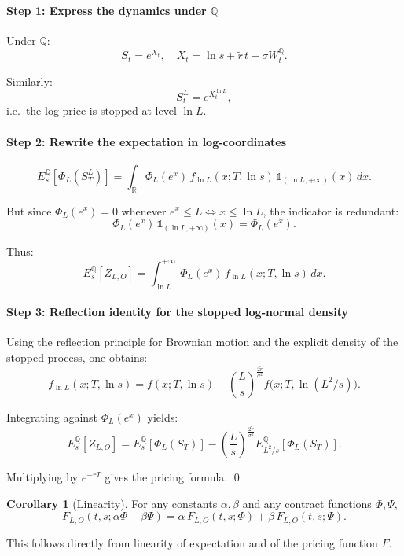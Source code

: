 \documentclass[12pt,a4paper]{article}
\theoremstyle{definition}
\newtheorem{corollary}{Corollary}[section]
\begin{document}
\paragraph{Step 1: Express the dynamics under $\mathbb{Q}$}

Under $\mathbb{Q}$:
\[
S_t = e^{X_t}, \quad X_t = \ln s + \widetilde{r}\, t + \sigma W_t^\mathbb{Q}.
\]

Similarly:
\[
S_t^L = e^{X_t^{\ln L}},
\]
i.e.\ the log-price is stopped at level $\ln L$.

\paragraph{Step 2: Rewrite the expectation in log-coordinates}

\[
E_s^\mathbb{Q}[\Phi_L(S_T^L)] = \int_\mathbb{R} \Phi_L(e^x)\, f_{\ln L}(x; T, \ln s)\, \mathds{1}_{(\ln L, +\infty)}(x)\, dx.
\]

But since $\Phi_L(e^x) = 0$ whenever $e^x \leq L \iff x \leq \ln L$, the indicator is redundant:
\[
\Phi_L(e^x)\, \mathds{1}_{(\ln L, +\infty)}(x) = \Phi_L(e^x).
\]

Thus:
\[
E_s^\mathbb{Q}[Z_{L,O}] = \int_{\ln L}^{+\infty} \Phi_L(e^x)\, f_{\ln L}(x; T, \ln s)\, dx.
\]

\paragraph{Step 3: Reflection identity for the stopped log-normal density}

Using the reflection principle for Brownian motion and the explicit density of the stopped process, one obtains:
\[
f_{\ln L}(x; T, \ln s) = f(x; T, \ln s) - \left(\frac{L}{s}\right)^{\frac{2\widetilde{r}}{\sigma^2}} f\big(x; T, \ln(L^2/s)\big).
\]

Integrating against $\Phi_L(e^x)$ yields:
\[
E_s^\mathbb{Q}[Z_{L,O}] = E_s^\mathbb{Q}[\Phi_L(S_T)] - \left(\frac{L}{s}\right)^{\frac{2\widetilde{r}}{\sigma^2}} E_{L^2/s}^\mathbb{Q}[\Phi_L(S_T)].
\]

Multiplying by $e^{-rT}$ gives the pricing formula. \qed

\begin{corollary}[Linearity]
For any constants $\alpha, \beta$ and any contract functions $\Phi, \Psi$,
\[
F_{L,O}(t, s; \alpha\Phi + \beta\Psi) = \alpha\, F_{L,O}(t, s; \Phi) + \beta\, F_{L,O}(t, s; \Psi).
\]
\end{corollary}

This follows directly from linearity of expectation and of the pricing function $F$.
\end{document}

